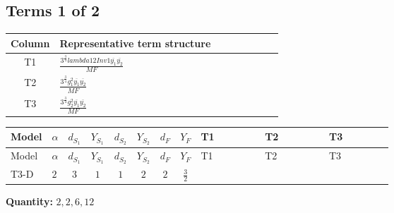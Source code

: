 \documentclass[8pt]{article}
\begin{document}
\begin{landscape}
\subsection*{Terms 1 of 2}
\begin{center}
\begin{tabular}{@{}c >{\raggedright\arraybackslash}p{0.82\linewidth}@{}}
\toprule
Column & Representative term structure \\
\midrule
T1 & \(\displaystyle \frac{3^{\frac{3}{4}} lambda12Inv1 \overline{y_{1}} \overline{y_{2}}}{MF}\) \\
\midrule
T2 & \(\displaystyle \frac{3^{\frac{3}{4}} g_{1}^{2} \overline{y_{1}} \overline{y_{2}}}{MF}\) \\
\midrule
T3 & \(\displaystyle \frac{3^{\frac{3}{4}} g_{2}^{2} \overline{y_{1}} \overline{y_{2}}}{MF}\) \\
\midrule
\bottomrule
\end{tabular}
\end{center}
\smallskip
\tiny
\begin{longtable}{@{}llcccccc >{\raggedright\arraybackslash}p{0.21\linewidth} >{\raggedright\arraybackslash}p{0.21\linewidth} >{\raggedright\arraybackslash}p{0.21\linewidth}@{}}
\toprule
Model & $\alpha$ & $d_{S_1}$ & $Y_{S_1}$ & $d_{S_2}$ & $Y_{S_2}$ & $d_F$ & $Y_F$ & T1 & T2 & T3 \\
\midrule
\endfirsthead
\toprule
Model & $\alpha$ & $d_{S_1}$ & $Y_{S_1}$ & $d_{S_2}$ & $Y_{S_2}$ & $d_F$ & $Y_F$ & T1 & T2 & T3 \\
\midrule
\endhead
T3-D & $2$ & $3$ & $1$ & $1$ & $2$ & $2$ & $\frac{3}{2}$ & \scriptsize\adjustbox{max width=\linewidth}{$\begin{gathered} \frac{3^{\frac{3}{4}} lambda12Inv1 \overline{y_{1}} \overline{y_{2}}}{6 MF}\end{gathered}$} & \scriptsize\adjustbox{max width=\linewidth}{$\begin{gathered} \frac{9 \cdot 3^{\frac{3}{4}} g_{1}^{2} \overline{y_{1}} \overline{y_{2}}}{8 MF}\end{gathered}$} & \scriptsize\adjustbox{max width=\linewidth}{$\begin{gathered} \frac{11 \cdot 3^{\frac{3}{4}} g_{2}^{2} \overline{y_{1}} \overline{y_{2}}}{8 MF}\end{gathered}$} \\
\midrule
\bottomrule
\end{longtable}
\clearpage
\noindent\textbf{Quantity: }$\mathrm{2,2,6,12}$\par\smallskip

\end{landscape}
\end{document}
